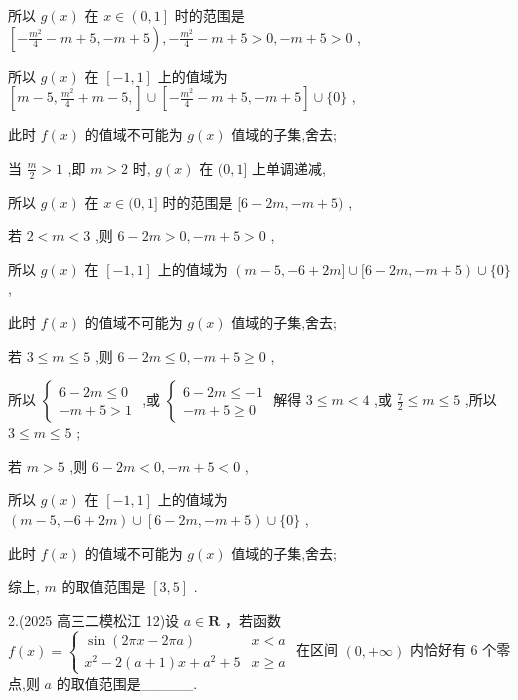 \documentclass[10pt]{article}
\begin{document}
所以 \(g\left( x\right)\) 在 \(x \in  \left( {0,1}\right\rbrack\) 时的范围是 \(\left\lbrack  {-\frac{{m}^{2}}{4} - m + 5, - m + 5}\right) , - \frac{{m}^{2}}{4} - m + 5 > 0, - m + 5 > 0\) ,

所以 \(g\left( x\right)\) 在 \(\left\lbrack  {-1,1}\right\rbrack\) 上的值域为 \(\left\lbrack  {m - 5,\frac{{m}^{2}}{4} + m - 5,}\right\rbrack   \cup  \left\lbrack  {-\frac{{m}^{2}}{4} - m + 5, - m + 5}\right\rbrack   \cup  \{ 0\}\) ,

此时 \(f\left( x\right)\) 的值域不可能为 \(g\left( x\right)\) 值域的子集,舍去;

当 \(\frac{m}{2} > 1\) ,即 \(m > 2\) 时, \(g\left( x\right)\) 在 \((0,1\rbrack\) 上单调递减,

所以 \(g\left( x\right)\) 在 \(x \in  (0,1\rbrack\) 时的范围是 \(\lbrack 6 - {2m}, - m + 5)\) ,

若 \(2 < m < 3\) ,则 \(6 - {2m} > 0, - m + 5 > 0\) ,

所以 \(g\left( x\right)\) 在 \(\left\lbrack  {-1,1}\right\rbrack\) 上的值域为 \(\left( {m - 5, - 6 + {2m}\rbrack \cup \lbrack 6 - {2m}, - m + 5}\right)  \cup  \{ 0\}\) ,

此时 \(f\left( x\right)\) 的值域不可能为 \(g\left( x\right)\) 值域的子集,舍去;

若 \(3 \leq  m \leq  5\) ,则 \(6 - {2m} \leq  0, - m + 5 \geq  0\) ,

所以 \(\left\{  \begin{array}{l} 6 - {2m} \leq  0 \\   - m + 5 > 1 \end{array}\right.\) ,或 \(\left\{  \begin{array}{l} 6 - {2m} \leq   - 1 \\   - m + 5 \geq  0 \end{array}\right.\) 解得 \(3 \leq  m < 4\) ,或 \(\frac{7}{2} \leq  m \leq  5\) ,所以 \(3 \leq  m \leq  5\) ;

若 \(m > 5\) ,则 \(6 - {2m} < 0, - m + 5 < 0\) ,

所以 \(g\left( x\right)\) 在 \(\left\lbrack  {-1,1}\right\rbrack\) 上的值域为 \(\left( {m - 5, - 6 + {2m}}\right)  \cup  \left\lbrack  {6 - {2m}, - m + 5}\right)  \cup  \{ 0\}\) ,

此时 \(f\left( x\right)\) 的值域不可能为 \(g\left( x\right)\) 值域的子集,舍去;

综上, \(m\) 的取值范围是 \(\left\lbrack  {3,5}\right\rbrack\) .

2.(2025 高三二模松江 12)设 \(a \in  \mathbf{R}\) ，若函数 \(f\left( x\right)  = \left\{  \begin{matrix} \sin \left( {{2\pi x} - {2\pi a}}\right) & x < a \\  {x}^{2} - 2\left( {a + 1}\right) x + {a}^{2} + 5 & x \geq  a \end{matrix}\right.\) 在区间 \(\left( {0, + \infty }\right)\) 内恰好有 6 个零点,则 \(a\) 的取值范围是\_\_\_\_\_.
\end{document}
